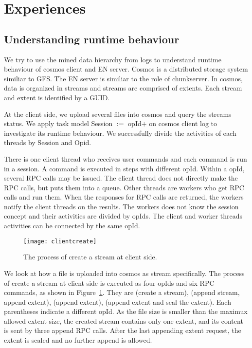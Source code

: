 
\section{Experiences}
\label{sec:exp}


\subsection{Understanding runtime behaviour}

We try to use the mined data hierarchy from logs to
understand runtime behaviour of cosmos client and EN server.
Cosmos is a distributed storage system similiar to GFS. The
EN server is similiar to the role of chunkserver. In cosmos,
data is organized in streams and streams are comprised of
extents. Each stream and extent is identified by a GUID.

At the client side, we upload several files into cosmos and
query the streams status. We apply task model Session $:=$
opId$+$ on cosmos client log to investigate its runtime
behaviour. We successfully divide the activities of each
threads by Session and Opid.

There is one client thread who receives user commands and
each command is run in a session. A command is executed in
steps with different opId. Within a opId,  several RPC calls
may be issued. The client thread does not directly make the
RPC calls, but puts them into a queue. Other threads are
workers who get RPC calls and run them. When the responses
for RPC calls are returned, the workers notify the client
threads on the results. The workers does not know the
session concept and their activities are divided by opIds.
The client and worker threads activities can be connected by
the same opId.

\begin{figure}
\centering
\texttt{[image: clientcreate]}
\caption{The process of create a stream at client side.}
\label{fig:clientcreate}
\end{figure}

We look at how a file is uploaded into cosmos as stream
specifically. The process of create a stream at client side
is executed as four opIds and six RPC commands, as shown in
Figure~\ref{fig:clientcreate}. They are (create a stream),
(append stream, append extent), (append extent), (append
extent and seal the extent). Each parentheses indicate a
different opId. As the file size is smaller than the maximux
allowed extent size, the created stream contains only one
extent, and its content is sent by three append RPC calls.
After the last appending extent request, the extent is
sealed and no further append is allowed.

